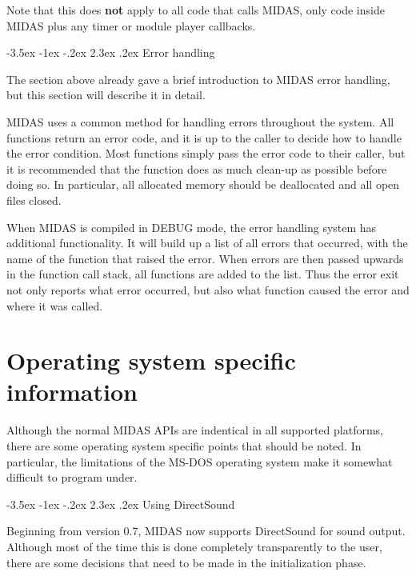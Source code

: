 \documentclass[a4paper,12pt,oneside]{book}
\makeatletter
\renewcommand\section{\@startsection {section}{1}{-20pt}%
                                   {-3.5ex \@plus -1ex \@minus -.2ex}%
                                   {2.3ex \@plus.2ex}%
                                   {\normalfont\Large\bfseries}}
\makeatother
\begin{document}
Note that this does {\bf not} apply to all code that calls MIDAS, only
code inside MIDAS plus any timer or module player callbacks.



\section{Error handling}

The section above already gave a brief introduction to MIDAS error handling,
but this section will describe it in detail.

MIDAS uses a common method for handling errors throughout the system. All
functions return an error code, and it is up to the caller to decide how to
handle the error condition. Most functions simply pass the error code to
their caller, but it is recommended that the function does as much clean-up
as possible before doing so. In particular, all allocated memory should be
deallocated and all open files closed.

When MIDAS is compiled in DEBUG mode, the error handling system has
additional functionality. It will build up a list of all errors that
occurred, with the name of the function that raised the error. When errors
are then passed upwards in the function call stack, all functions are added
to the list. Thus the error exit not only reports what error occurred, but
also what function caused the error and where it was called.



\chapter{Operating system specific information}

Although the normal MIDAS APIs are indentical in all supported platforms,
there are some operating system specific points that should be noted. In
particular, the limitations of the MS-DOS operating system make it somewhat
difficult to program under.


\section{Using DirectSound}

Beginning from version 0.7, MIDAS now supports DirectSound for sound output.
Although most of the time this is done completely transparently to the user,
there are some decisions that need to be made in the initialization phase.
\end{document}
